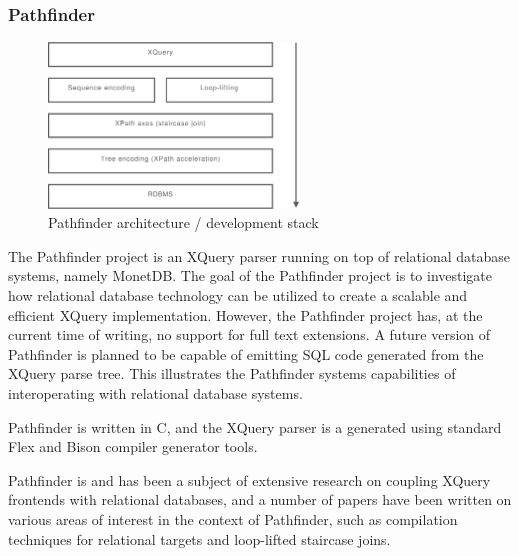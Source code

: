 \subsubsection{Pathfinder}
\label{sect:soa:pathfinder}
\begin{figure}[!h]
  \centering
    \includegraphics[width=0.6\textwidth]{diagrams/pathfinder_arch}
  \caption{Pathfinder architecture / development stack}
\end{figure}

The Pathfinder project is an XQuery parser running on top of relational
database systems, namely MonetDB. The goal of the Pathfinder project is to
investigate how relational database technology can be utilized to create a
scalable and efficient XQuery implementation. However, the Pathfinder project
has, at the current time of writing, no support for full text extensions. A
future version of Pathfinder is planned to be capable of emitting SQL code
generated from the XQuery parse tree. This illustrates the Pathfinder systems
capabilities of interoperating with relational database systems.

Pathfinder is written in C, and the XQuery parser is a generated using standard
Flex and Bison compiler generator tools.

Pathfinder is and has been a subject of extensive research on coupling XQuery
frontends with relational databases, and a number of papers have been written 
on various areas of interest in the context of Pathfinder, such as compilation
techniques for relational targets\cite{pathfinder_comptech} and loop-lifted
staircase joins\cite{pathfinder_staircase}.

